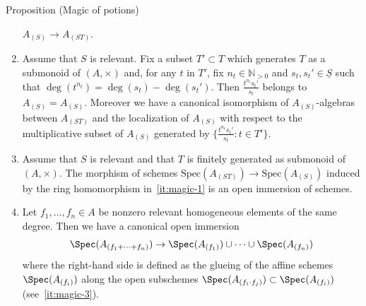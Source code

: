 \documentclass[9pt]{beamer}
\begin{document}
\begin{frame}
\begin{block}{Proposition (Magic of potions)}
\begin{enumerate}
$A_{(S )} \to  A_{(ST )}$.
\item 
\label{it:magic-2}
Assume that $S$ is relevant. Fix a subset $T' \subset T$ which generates $T$ as a submonoid of $(A,\times)$ and, for any $t $ in $T'$, fix $n_t \in \mathbb{N}_{>0}$ and $s_t, s_t' \in \underline{S}$ such that $\deg(t^{n_t}) = \deg(s_t)-\deg(s_t')$.
Then $\frac{t^{n_t} s_t'} { s_t}$ belongs to $A_{(\underline{S} )}=A_{(S)}$. 
 Moreover we have a canonical isomorphism of $A_{(S )}$-algebras between $ A_{(ST )}$ and the localization of $A_{(S )}$ with respect to the multiplicative subset of $A_{(S)}$ generated by $\{\frac{t^{n_t} s_t'} { s_t} : t \in T' \}$.
\item 
\label{it:magic-3}
Assume that $S$ is relevant and that $T$ is finitely generated as submonoid of $(A,\times)$. The morphism of schemes 
$
\mathrm{Spec} (A_{(ST )}) \to \mathrm{Spec} (A_{(S)})
$
induced by the ring homomorphism in~\eqref{it:magic-1} is an open immersion of schemes.
\item 
\label{it:magic-4}
Let $f_1, \ldots, f_n \in A$ be nonzero relevant homogeneous elements of the same degree.
Then we have a canonical open immersion
\[
\Spec(A_{ (f_1 + \cdots + f_n) }) \to \Spec (A_{(f_1)}) \cup \cdots \cup \Spec (A_{(f_n)})
\]
where the right-hand side is defined as the glueing of the affine schemes $\Spec (A_{(f_i)})$ along the open subschemes $\Spec (A_{(f_i \cdot f_j)}) \subset \Spec (A_{(f_i)})$ (see~\eqref{it:magic-3}).

\end{enumerate}
\end{block}
\end{frame}
\end{document}
